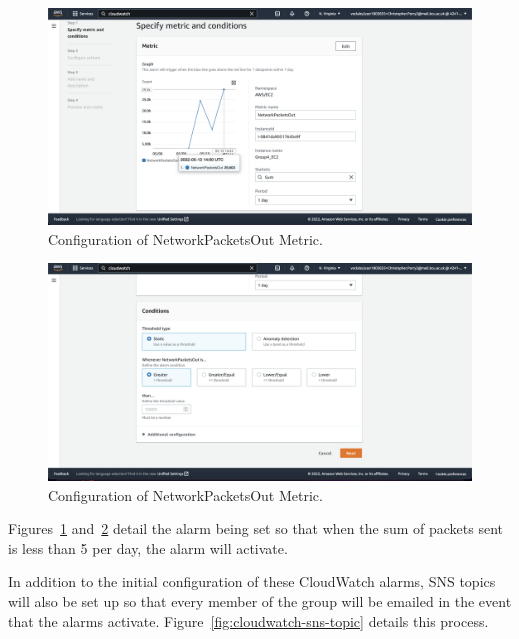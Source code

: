 \begin{figure}[!htbp]
    \centering
    \includegraphics[width=\textwidth]{resources/cloudwatch/cloudwatch-metric-config-1}
    \caption{Configuration of NetworkPacketsOut Metric.}
    \label{fig:cloudwatch-metrics-config-1}
\end{figure}

\begin{figure}[!htbp]
    \centering
    \includegraphics[width=\textwidth]{resources/cloudwatch/cloudwatch-metric-config-2}
    \caption{Configuration of NetworkPacketsOut Metric.}
    \label{fig:cloudwatch-metric-config-2}
\end{figure}

Figures~\ref{fig:cloudwatch-metrics-config-1} and~\ref{fig:cloudwatch-metric-config-2} detail the alarm being set so that
when the sum of packets sent is less than 5 per day, the alarm will activate.

In addition to the initial configuration of these CloudWatch alarms, SNS topics will also be set up so that every member
of the group will be emailed in the event that the alarms activate.
Figure~\ref{fig:cloudwatch-sns-topic} details this process.

